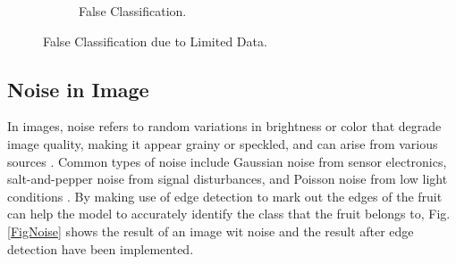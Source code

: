 \documentclass[conference]{IEEEtran}
\begin{document}
\begin{figure}[h]
\begin{subfigure}[b]{0.48\linewidth}
        \caption{False Classification.}
        \label{figFB}
    \end{subfigure}
    \caption{False Classification due to Limited Data.}
    \label{FigLimData}
\end{figure}

\subsection{Noise in Image}

In images, noise refers to random variations in brightness or color that degrade image quality, making it appear grainy or speckled, and can arise from various sources \cite{b19}. Common types of noise include Gaussian noise from sensor electronics, salt-and-pepper noise from signal disturbances, and Poisson noise from low light conditions \cite{b19}. By making use of edge detection to mark out the edges of the fruit \cite{b20} can help the model to accurately identify the class that the fruit belongs to, Fig. \ref{FigNoise} shows the result of an image wit noise and the result after edge detection have been implemented.
\end{document}
